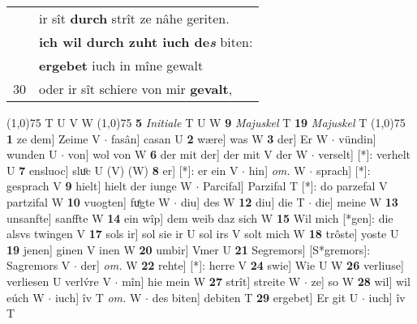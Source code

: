 \documentclass[8pt,a4paper,notitlepage]{article}
\begin{document}
\begin{table}[ht]
\begin{minipage}[t]{0.5\linewidth}
\begin{tabular}{rl}
 & ir sît \textbf{durch} strît ze nâhe geriten.\\ 
 & \textbf{ich wil durch zuht iuch de\textit{s}} biten:\\ 
 & \textbf{ergebet} iuch in mîne gewalt\\ 
30 & oder ir sît schiere von mir \textbf{gevalt},\\ 
\end{tabular}
\scriptsize
\line(1,0){75} \newline
T U V W \newline
\line(1,0){75} \newline
\textbf{5} \textit{Initiale} T U W  \textbf{9} \textit{Majuskel} T  \textbf{19} \textit{Majuskel} T  \newline
\line(1,0){75} \newline
\textbf{1} ze dem] Zeime V  $\cdot$ fasân] casan U \textbf{2} wære] was W \textbf{3} der] Er W  $\cdot$ vündin] wunden U  $\cdot$ von] wol von W \textbf{6} der mit der] der mit V der W  $\cdot$ verselt] [*]: verhelt U \textbf{7} ensluoc] sluͦc U (V) (W) \textbf{8} er] [*]: er ein V  $\cdot$ hin] \textit{om.} W  $\cdot$ sprach] [*]: gesprach V \textbf{9} hielt] hielt der iunge W  $\cdot$ Parcifal] Parzifal T [*]: do parzefal V partzifal W \textbf{10} vuogten] fuͤgte W  $\cdot$ diu] des W \textbf{12} diu] die T  $\cdot$ die] meine W \textbf{13} unsanfte] sanffte W \textbf{14} ein wîp] dem weib daz sich W \textbf{15} Wil mich [*gen]: die alsvs twingen V \textbf{17} sols ir] sol sie ir U sol irs V solt mich W \textbf{18} trôste] yoste U \textbf{19} jenen] ginen V inen W \textbf{20} umbir] Vmer U \textbf{21} Segremors] [S*gremors]: Sagremors V  $\cdot$ der] \textit{om.} W \textbf{22} rehte] [*]: herre V \textbf{24} swie] Wie U W \textbf{26} verliuse] verliesen U verlv́re V  $\cdot$ mîn] hie mein W \textbf{27} strît] streite W  $\cdot$ ze] so W \textbf{28} wil] wil eúch W  $\cdot$ iuch] îv T \textit{om.} W  $\cdot$ des biten] debiten T \textbf{29} ergebet] Er git U  $\cdot$ iuch] îv T \newline
\end{minipage}
\end{table}
\end{document}
